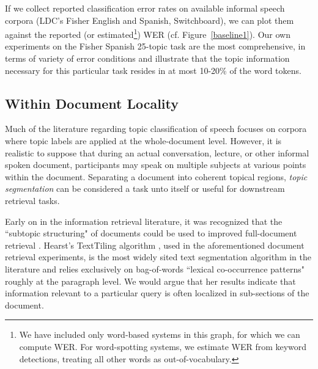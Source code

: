 If we collect reported classification error rates on available informal speech corpora (LDC's Fisher English and Spanish, Switchboard), we can plot them against the reported (or estimated\footnote{We have included only word-based systems in this graph, for which we can compute WER. For word-spotting systems, we estimate WER from keyword detections, treating all other words as out-of-vocabulary.}) WER (cf. Figure~\ref{baseline1}).  Our own experiments on the Fisher Spanish 25-topic task are the most comprehensive, in terms of variety of error conditions and illustrate that the topic information necessary for this particular task resides in at most 10-20\% of the word tokens.



\subsection{Within Document Locality}

Much of the literature regarding topic classification of speech focuses on corpora where topic labels are applied at the whole-document level. However, it is realistic to suppose that during an actual conversation, lecture, or other informal spoken document, participants may speak on multiple subjects at various points within the document.  Separating a document into coherent topical regions, \textit{topic segmentation} can be considered a task unto itself or useful for downstream retrieval tasks.

Early on in the information retrieval literature, it was recognized that the ``subtopic structuring" of documents could be used to improved full-document retrieval \cite{hearst1993subtopic}.  Hearst's TextTiling algorithm \cite{hearst1997}, used in the aforementioned document retrieval experiments, is the most widely sited text segmentation algorithm in the literature and relies exclusively on bag-of-words ``lexical co-occurrence patterns" roughly at the paragraph level.  We would argue that her results indicate that information relevant to a particular query is often localized in sub-sections of the document.

